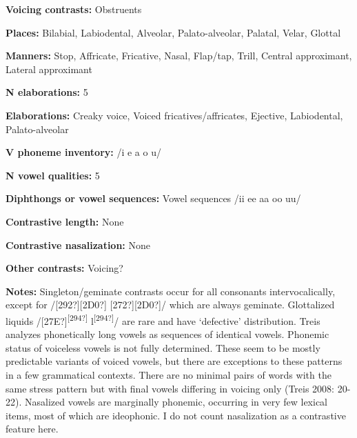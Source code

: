 \begin{styleBody}
\textbf{Voicing contrasts: }Obstruents
\end{styleBody}

\begin{styleBody}
\textbf{Places: }Bilabial, Labiodental, Alveolar, Palato-alveolar, Palatal, Velar, Glottal
\end{styleBody}

\begin{styleBody}
\textbf{Manners:} Stop, Affricate, Fricative, Nasal, Flap/tap, Trill, Central approximant, Lateral approximant
\end{styleBody}

\begin{styleBody}
\textbf{N elaborations: }5
\end{styleBody}

\begin{styleBody}
\textbf{Elaborations:} Creaky voice, Voiced fricatives/affricates, Ejective, Labiodental, Palato-alveolar
\end{styleBody}

\begin{styleBody}
\textbf{V phoneme inventory:} /i e a o u/
\end{styleBody}

\begin{styleBody}
\textbf{N vowel qualities:} 5
\end{styleBody}

\begin{styleBody}
\textbf{Diphthongs or vowel sequences:} Vowel sequences /ii ee aa oo uu/
\end{styleBody}

\begin{styleBody}
\textbf{Contrastive length:} None
\end{styleBody}

\begin{styleBody}
\textbf{Contrastive nasalization:} None
\end{styleBody}

\begin{styleBody}
\textbf{Other contrasts:} Voicing?
\end{styleBody}

\begin{styleBody}
\textbf{Notes:} Singleton/geminate contrasts occur for all consonants intervocalically, except for /[292?][2D0?] [272?][2D0?]/ which are always geminate. Glottalized liquids /[27E?]\textsuperscript{[294?]} l\textsuperscript{[294?]}/ are rare and have ‘defective’ distribution. Treis analyzes phonetically long vowels as sequences of identical vowels. Phonemic status of voiceless vowels is not fully determined. These seem to be mostly predictable variants of voiced vowels, but there are exceptions to these patterns in a few grammatical contexts. There are no minimal pairs of words with the same stress pattern but with final vowels differing in voicing only (Treis 2008: 20-22). Nasalized vowels are marginally phonemic, occurring in very few lexical items, most of which are ideophonic. I do not count nasalization as a contrastive feature here.
\end{styleBody}

